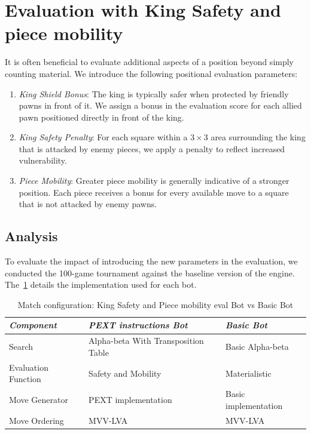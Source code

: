 \section{Evaluation with King Safety and piece mobility}

It is often beneficial to evaluate additional aspects of a position beyond simply counting material. We introduce the following positional evaluation parameters:

\begin{enumerate}
    \item \textit{King Shield Bonus}: The king is typically safer when protected by friendly pawns in front of it. We assign a bonus in the evaluation score for each allied pawn positioned directly in front of the king.

    \item \textit{King Safety Penalty}: For each square within a $3 \times 3$ area surrounding the king that is attacked by enemy pieces, we apply a penalty to reflect increased vulnerability.

    \item \textit{Piece Mobility}: Greater piece mobility is generally indicative of a stronger position. Each piece receives a bonus for every available move to a square that is not attacked by enemy pawns.
\end{enumerate}

\subsection{Analysis}

To evaluate the impact of introducing the new parameters in the evaluation, we conducted the 100-game tournament against the baseline version of the engine. The~\cref{tab:safety_mobility_vs_basic} details the implementation used for each bot.

\vspace{1em}

\begin{table}
    \centering
    \begin{tabular}{|p{4cm}|p{4cm}|p{4cm}|}
    \hline
    \textit{Component}         & \textit{PEXT instructions Bot}  & \textit{Basic Bot}     \\ \hline
    Search                     & Alpha-beta With Transposition Table          & Basic Alpha-beta           \\ \hline
    Evaluation Function        & Safety and Mobility                      & Materialistic      \\ \hline
    Move Generator             & PEXT implementation              & Basic implementation   \\ \hline
    Move Ordering              & MVV-LVA                           & MVV-LVA                \\ \hline
    \end{tabular}
    \caption{Match configuration: King Safety and Piece mobility eval Bot vs Basic Bot}\label{tab:safety_mobility_vs_basic}
\end{table}

